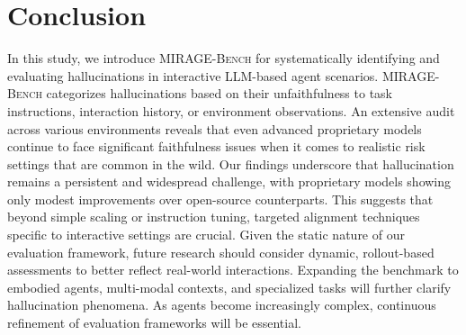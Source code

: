 \section{Conclusion}

In this study, we introduce \textsc{MIRAGE-Bench} for systematically identifying and evaluating hallucinations in interactive LLM-based agent scenarios. \textsc{MIRAGE-Bench} categorizes hallucinations based on their unfaithfulness to task instructions, interaction history, or environment observations. An extensive audit across various environments reveals that even advanced proprietary models continue to face significant faithfulness issues when it comes to realistic risk settings that are common in the wild.
Our findings underscore that hallucination remains a persistent and widespread challenge, with proprietary models showing only modest improvements over open-source counterparts. This suggests that beyond simple scaling or instruction tuning, targeted alignment techniques specific to interactive settings are crucial.
Given the static nature of our evaluation framework, future research should consider dynamic, rollout-based assessments to better reflect real-world interactions. Expanding the benchmark to embodied agents, multi-modal contexts, and specialized tasks will further clarify hallucination phenomena. As agents become increasingly complex, continuous refinement of evaluation frameworks will be essential.

